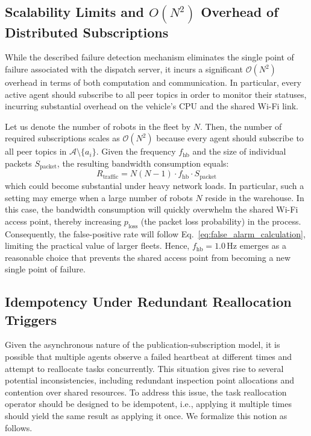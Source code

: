 \subsection{Scalability Limits and \texorpdfstring{$O(N^2)$}{O(N^2)} Overhead of Distributed Subscriptions}

While the described failure detection mechanism eliminates the single point of failure associated with the dispatch server, it incurs a significant $\mathcal{O}(N^2)$ overhead in terms of both computation and communication. In particular, every active agent should subscribe to all peer topics in order to monitor their statuses, incurring substantial overhead on the vehicle's CPU and the shared Wi-Fi link.

Let us denote the number of robots in the fleet by $N$. Then, the number of required subscriptions scales as $\mathcal{O}(N^2)$ because every agent should subscribe to all peer topics in $\mathcal{A} \setminus \{a_i\}$. Given the frequency $f_{\text{hb}}$ and the size of individual packets $S_{\text{packet}}$, the resulting bandwidth consumption equals:
\begin{equation} R_{\text{traffic}} = N(N - 1) \cdot f_{\text{hb}} \cdot S_{\text{packet}} \label{eq:network_traffic_scale} \end{equation}
which could become substantial under heavy network loads. In particular, such a setting may emerge when a large number of robots $N$ reside in the warehouse. In this case, the bandwidth consumption will quickly overwhelm the shared Wi-Fi access point, thereby increasing $p_{\text{loss}}$ (the packet loss probability) in the process. Consequently, the false-positive rate will follow Eq.~\ref{eq:false_alarm_calculation}, limiting the practical value of larger fleets. Hence, $f_{\text{hb}} = 1.0\,\text{Hz}$ emerges as a reasonable choice that prevents the shared access point from becoming a new single point of failure.

\subsection{Idempotency Under Redundant Reallocation Triggers}

Given the asynchronous nature of the publication-subscription model, it is possible that multiple agents observe a failed heartbeat at different times and attempt to reallocate tasks concurrently. This situation gives rise to several potential inconsistencies, including redundant inspection point allocations and contention over shared resources. To address this issue, the task reallocation operator should be designed to be idempotent, i.e., applying it multiple times should yield the same result as applying it once. We formalize this notion as follows.

